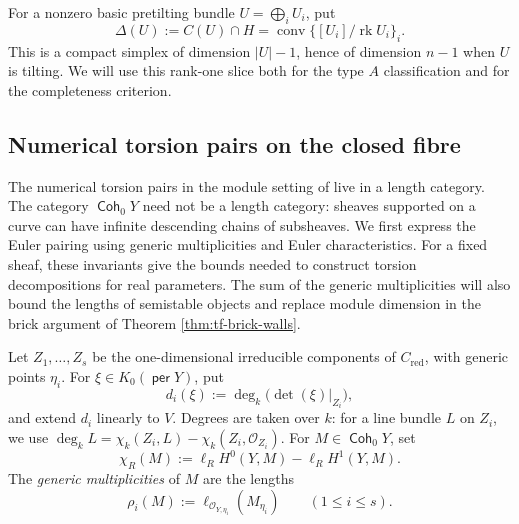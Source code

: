 \documentclass[a4paper,reqno]{amsart}
\def\O{\mathcal{O}}
\DeclareMathOperator{\Coh}{\mathsf{Coh}}
\DeclareMathOperator{\per}{\mathsf{per}}
\DeclareMathOperator{\rk}{rk}
\DeclareMathOperator{\Conv}{conv}
\theoremstyle{definition}
\begin{document}
For a nonzero basic pretilting bundle $U=\bigoplus_iU_i$, put
\[
\Delta(U):=C(U)\cap H
=\Conv\{[U_i]/\rk U_i\}_i.
\]
This is a compact simplex of dimension $|U|-1$, hence of dimension $n-1$ when $U$ is tilting. We will use this rank-one slice both for the type $A$ classification and for the completeness criterion.

\subsection{Numerical torsion pairs on the closed fibre}

The numerical torsion pairs in the module setting of \cite[Proposition 2.11]{Asa21} live in a length category. The category $\Coh_0Y$ need not be a length category: sheaves supported on a curve can have infinite descending chains of subsheaves. We first express the Euler pairing using generic multiplicities and Euler characteristics. For a fixed sheaf, these invariants give the bounds needed to construct torsion decompositions for real parameters. The sum of the generic multiplicities will also bound the lengths of semistable objects and replace module dimension in the brick argument of Theorem \ref{thm:tf-brick-walls}.

Let $Z_1,\ldots,Z_s$ be the one-dimensional irreducible components of $C_{\mathrm{red}}$, with generic points $\eta_i$. For $\xi\in K_0(\per Y)$, put
\[
d_i(\xi):=\deg_k\bigl(\det(\xi)|_{Z_i}\bigr),
\]
and extend $d_i$ linearly to $V$. Degrees are taken over $k$: for a line bundle $L$ on $Z_i$, we use $\deg_k L=\chi_k(Z_i,L)-\chi_k(Z_i,\O_{Z_i})$. For $M\in\Coh_0Y$, set
\[
\chi_R(M):=\ell_R H^0(Y,M)-\ell_R H^1(Y,M)
.
\]
The \emph{generic multiplicities} of $M$ are the lengths
\begin{equation}\label{eq:generic-multiplicity}
\rho_i(M):=\ell_{\O_{Y,\eta_i}}(M_{\eta_i})
\qquad(1\le i\le s).
\end{equation}
\end{document}
